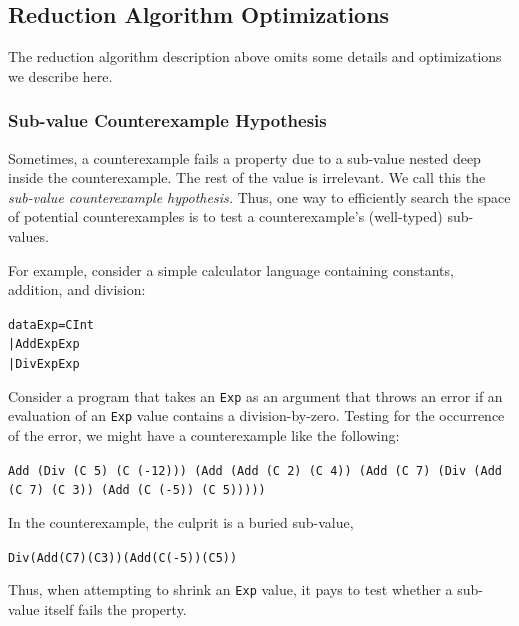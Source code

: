 \documentclass[10pt]{sigplanconf}
\newenvironment{code}{\begin{alltt}\small}{\end{alltt}}
\newcommand{\ttp}[1]{\texttt{#1}}
\begin{document}
\subsection{Reduction Algorithm Optimizations}
The reduction algorithm description above omits some details and optimizations
we describe here.

\subsubsection{Sub-value Counterexample Hypothesis}\label{sec:subval}
Sometimes, a counterexample fails a property due to a sub-value nested deep
inside the counterexample.  The rest of the value is irrelevant.  We call this
the \emph{sub-value counterexample hypothesis.}  Thus, one way to efficiently
search the space of potential counterexamples is to test a counterexample's
(well-typed) sub-values.

For example, consider a simple calculator language containing constants,
addition, and division:
%
\begin{code}
data Exp = C Int
         | Add Exp Exp
         | Div Exp Exp
\end{code}
%
\noindent
Consider a program that takes an \ttp{Exp} as an argument that throws an error
if an evaluation of an \ttp{Exp} value contains a division-by-zero.  Testing for
the occurrence of the error, we might have a counterexample like the following:
%
\medskip%
\begin{sloppypar}
\noindent%
\ttp{Add (Div (C 5) (C (-12))) (Add (Add (C 2) (C 4)) (Add (C 7) (Div (Add (C 7)
  (C 3)) (Add (C (-5)) (C 5)))))}
\end{sloppypar}
\medskip%
In the counterexample, the culprit is a buried sub-value,
%
\begin{code}
Div (Add (C 7) (C 3)) (Add (C (-5)) (C 5))
\end{code}
%
Thus, when attempting to shrink an \ttp{Exp} value, it pays to test whether a
sub-value itself fails the property.
\end{document}
